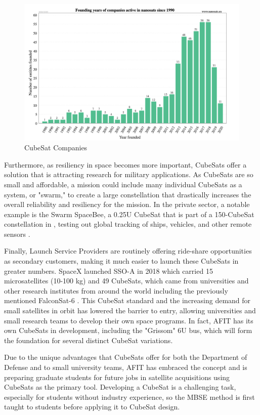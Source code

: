 \begin{figure}
    \centering
    \includegraphics[width=\textwidth]{Thesis/Literature_Review/Lit Review Figures/CubeSat companies.png}
    \caption{CubeSat Companies}
    \label{fig:CubeSat Companies}
\end{figure}

Furthermore, as resiliency in space becomes more important, CubeSats offer a solution that is attracting research for military applications. As CubeSats are so small and affordable, a mission could include many individual CubeSats as a system, or "swarm," to create a large constellation that drastically increases the overall reliability and resiliency for the mission. In the private sector, a notable example is the Swarm SpaceBee, a 0.25U CubeSat that is part of a 150-CubeSat constellation in , testing out global  tracking of ships, vehicles, and other remote sensors \citep{Harris2019}. 

Finally, Launch Service Providers are routinely offering ride-share opportunities as secondary customers, making it much easier to launch these CubeSats in greater numbers. SpaceX launched SSO-A in 2018 which carried 15 microsatellites (10-100 kg) and 49 CubeSats, which came from universities and other research institutes from around the world including the previously mentioned FalconSat-6 \citep{eoPortal}. This CubeSat standard and the increasing demand for small satellites in orbit has lowered the barrier to entry, allowing universities and small research teams to develop their own space programs. In fact, AFIT has its own CubeSats in development, including the "Grissom" 6U bus, which will form the foundation for several distinct CubeSat variations.

Due to the unique advantages that CubeSats offer for both the Department of Defense and to small university teams, AFIT has embraced the concept and is preparing graduate students for future jobs in satellite acquisitions using CubeSats as the primary tool. Developing a CubeSat is a challenging task, especially for students without industry experience, so the MBSE method is first taught to students before applying it to CubeSat design.





